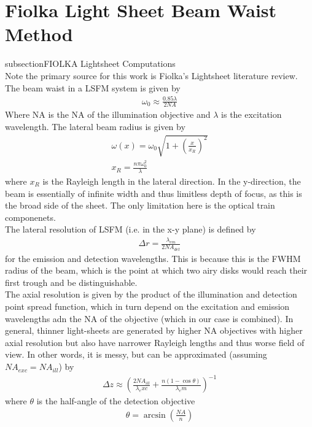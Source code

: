 \section[]{Fiolka Light Sheet Beam Waist Method}
subsection{FIOLKA Lightsheet Computations}\\
Note the primary source for this work is Fiolka's Lightsheet literature review. The beam waist in a LSFM system is given by 
\begin{gather}
    \omega_0 \approx \frac{0.85 \lambda}{2 NA}
\end{gather}
    Where NA is the NA of the illumination objective and $\lambda$ is the excitation wavelength. The lateral beam radius is given by 
    \begin{gather}
        \omega(x) = \omega_0 \sqrt{1 + \left(\frac{x}{x_R}\right)^2}\\
        x_R = \frac{n \pi \omega_0^2}{\lambda}
    \end{gather}
    where $x_R$ is the Rayleigh length in the lateral direction.
    In the y-direction, the beam is essentially of infinite width and thus limitless depth of focus, as this is the broad side of the sheet. The only limitation here is the optical train componenets.\\
    The lateral resolution of LSFM (i.e. in the x-y plane) is defined by 
    \begin{gather}
        \Delta r = \frac{\lambda_{em}}{2 NA_{det}}
    \end{gather}
    for the emission and detection wavelengths. This is because this is the FWHM radius of the beam, which is the point at which two airy disks would reach their first trough and be distinguishable.\\
    The axial resolution is given by the product of the illumination and detection point spread function, which in turn depend on the excitation and emission wavelengths adn the NA of the objective (which in our case is combined). In general, thinner light-sheets are generated by higher NA objectives with higher axial resolution but also have narrower Rayleigh lengths and thus worse field of view. In other words, it is messy, but can be approximated (assuming $NA_{exc}=NA_{ill}$) by
    \begin{gather}
        \Delta z \approx \left( \frac{2 NA_{ill}}{\lambda_exc} + \frac{n (1-\cos \theta)}{\lambda_em}\right)^{-1}
    \end{gather}
    where $\theta$ is the half-angle of the detection objective
    \begin{gather}
        \theta = \arcsin\left(\frac{NA}{n}\right)
    \end{gather}
